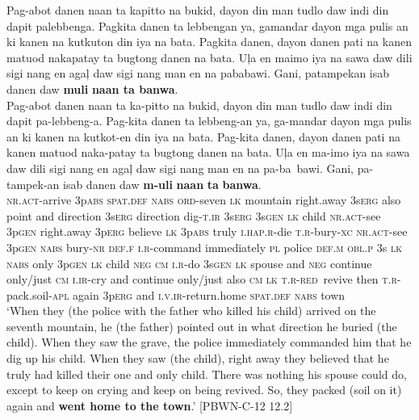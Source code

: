 \ea
\label{ex:tothetown}
Pag-abot danen naan ta kapitto na bukid, dayon din man tudlo daw indi din dapit palebbenga. Pagkita danen ta lebbengan ya, gamandar dayon mga pulis an ki kanen na kutkuton din iya na bata. Pagkita danen, dayon danen pati na kanen matuod nakapatay ta bugtong danen na bata. U\c{l}a en maimo iya na sawa daw dili sigi nang en aga\c{l} daw sigi nang man en na pababawi. Gani, patampekan isab danen daw \textbf{muli} \textbf{naan ta banwa}. \\
\vspace{4pt} \gll Pag-abot danen naan ta ka-pitto na bukid, dayon din man tudlo daw indi din dapit
pa-lebbeng-a. Pag-kita danen ta lebbeng-an ya, ga-mandar dayon mga pulis an ki kanen na
kutkot-en din iya na bata. Pag-kita danen, dayon danen pati na kanen matuod naka-patay ta
bugtong danen na bata. U\c{l}a en ma-imo iya na sawa daw dili sigi nang en aga\c{l} daw sigi nang man en na pa-ba~bawi. Gani, pa-tampek-an isab danen daw \textbf{m-uli} \textbf{naan}
\textbf{ta} \textbf{banwa}. \\
\textsc{nr.act}-arrive 3p\textsc{abs} \textsc{spat.def} \textsc{nabs} \textsc{ord}-seven \textsc{lk} mountain right.away 3s\textsc{erg} also point and direction 3s\textsc{erg} direction
dig-\textsc{t.ir} 3s\textsc{erg} 3s\textsc{gen} \textsc{lk} child \textsc{nr.act}-see 3p\textsc{gen} right.away 3p\textsc{erg}  believe \textsc{lk} 3p\textsc{abs} truly \textsc{i.hap.r}-die
\textsc{t.r}-bury-\textsc{xc} \textsc{nr.act}-see 3p\textsc{gen} \textsc{nabs} bury-\textsc{nr} \textsc{def.f} \textsc{i.r}-command immediately \textsc{pl} police \textsc{def.m} \textsc{obl.p} 3s \textsc{lk}
\textsc{nabs} only 3p\textsc{gen} \textsc{lk} child \textsc{neg} \textsc{cm} \textsc{i.r}-do 3s\textsc{gen} \textsc{lk} spouse and \textsc{neg} continue only/just \textsc{cm} \textsc{i.ir}-cry and continue only/just also
\textsc{cm} \textsc{lk} \textsc{t.r}-\textsc{red}~revive then \textsc{t.r}-pack.soil-\textsc{apl} again 3p\textsc{erg} and \textsc{i.v.ir}-return.home \textsc{spat.def} \textsc{nabs} town \\
\glt ‘When they (the police with the father who killed his child) arrived on the seventh mountain, he (the father) pointed out in what direction he buried (the child). When they saw the grave, the police immediately commanded him that he dig up his child. When they saw (the child), right away they believed that he truly had killed their one and only child. There was nothing his spouse could do, except to keep on crying and keep on being revived. So, they packed (soil on it) again and \textbf{went home to the town}.’ [PBWN-C-12 12.2]  
\z

